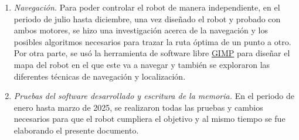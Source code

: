 \begin{enumerate}
 \item \textit{Navegación.} Para poder controlar el robot de manera independiente, en el periodo de julio hasta diciembre, una vez diseñado el robot y probado con ambos motores, se hizo una investigación acerca de la navegación y los posibles algoritmos necesarios para trazar la ruta óptima de un punto a otro. Por otra parte, se usó la herramienta de software libre \hyperlink{GIMP}{GIMP} para diseñar el mapa del robot en el que este va a navegar y también se exploraron las diferentes técnicas de navegación y localización.
 
   \item \textit{Pruebas del software desarrollado y escritura de la memoria.} En el periodo de enero hasta marzo de 2025, se realizaron todas las pruebas y cambios necesarios para que el robot cumpliera el objetivo y al mismo tiempo se fue elaborando el presente documento.
\end{enumerate}\

